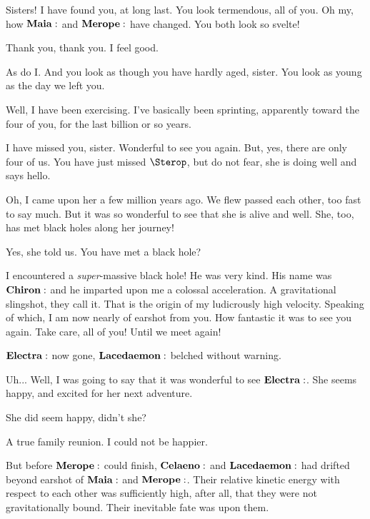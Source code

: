 \documentclass[main.tex]{subfiles}
\begin{document}
\Electra Sisters!  I have found you, at long last.  You look termendous, all of you.  Oh my, how $\Maia$ and $\Merope$ have changed.  You both look so svelte!

\Maia Thank you, thank you.  I feel good.

\Merope As do I.  And you look as though you have hardly aged, sister.  You look as young as the day we left you.

\Electra Well, I have been exercising.  I've basically been sprinting, apparently toward the four of you, for the last billion or so years.  

\Celaeno I have missed you, sister.  Wonderful to see you again.  But, yes, there are only four of us.  You have just missed $\Sterop$, but do not fear, she is doing well and says hello.

\Electra Oh, I came upon her a few million years ago.  We flew passed each other, too fast to say much.  But it was so wonderful to see that she is alive and well.  She, too, has met black holes along her journey!  

\Maia Yes, she told us.  You have met a black hole?

\Electra I encountered a \textit{super}-massive black hole!  He was very kind.  His name was $\Chiron$ and he imparted upon me a colossal acceleration.  A gravitational slingshot, they call it.  That is the origin of my ludicrously high velocity.  Speaking of which, I am now nearly of earshot from you.  How fantastic it was to see you again.  Take care, all of you!  Until we meet again! 


$\Electra$ now gone, $\Lacedaemon$ belched without warning.

\Celaeno Uh... Well, I was going to say that it was wonderful to see $\Electra$.  She seems happy, and excited for her next adventure.

\Maia She did seem happy, didn't she?  

\Merope A true family reunion.  I could not be happier.

But before $\Merope$ could finish, $\Celaeno$ and $\Lacedaemon$ had drifted beyond earshot of $\Maia$ and $\Merope$.  Their relative kinetic energy with respect to each other was sufficiently high, after all, that they were not gravitationally bound.  Their inevitable fate was upon them.
\end{document}
